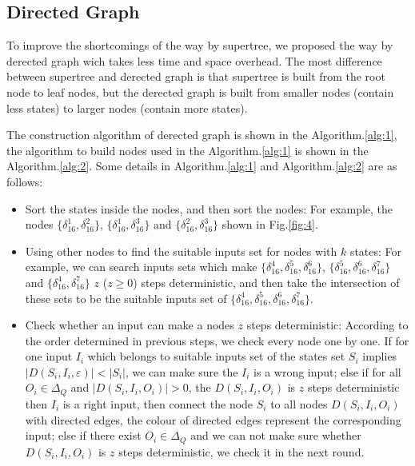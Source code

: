 \subsection{Directed Graph}
To improve the shortcomings of the way by supertree, we proposed the way by derected graph wich takes less time and space overhead. The most difference between supertree and derected graph is that supertree is built from the root node to leaf nodes, but the derected graph is built from smaller nodes (contain less states) to larger nodes (contain more states). 

The construction algorithm of derected graph is shown in the Algorithm.\ref{alg:1}, the algorithm to build nodes used in the Algorithm.\ref{alg:1} is shown in the Algorithm.\ref{alg:2}. Some details in Algorithm.\ref{alg:1} and Algorithm.\ref{alg:2} are as follows:
\begin{itemize}
 \item Sort the states inside the nodes, and then sort the nodes: For example, the nodes $\{\delta_{16}^1,\delta_{16}^2\}$, $\{\delta_{16}^1,\delta_{16}^3\}$ and $\{\delta_{16}^2,\delta_{16}^3\}$ shown in Fig.\ref{fig:4}. 
  \item Using other nodes to find the suitable inputs set for nodes with $k$ states: For example, we can search inputs sets which make $\{\delta_{16}^4,\delta_{16}^5,\delta_{16}^6\}$, $\{\delta_{16}^5,\delta_{16}^6,\delta_{16}^7\}$ and $\{\delta_{16}^4,\delta_{16}^7\}$ $z$ ($z\ge0$) steps deterministic, and then take the intersection of these sets to be the suitable inputs set of $\{\delta_{16}^4,\delta_{16}^5,\delta_{16}^6,\delta_{16}^7\}$. 
  \item Check whether an input can make a nodes $z$ steps deterministic: According to the order determined in previous steps, we check every node one by one. If for one input $I_i$ which belongs to suitable inputs set of the states set $S_i$ implies $|D\left(S_i,I_i,\varepsilon\right)|<|S_i|$, we can make sure the $I_i$ is a wrong input; else if for all $O_i \in \Delta_Q$ and $|D\left(S_i,I_i,O_i\right)|>0$, the $D\left(S_i,I_i,O_i\right)$ is $z$ steps deterministic then $I_i$ is a right input, then connect the node $S_i$ to all nodes $D\left(S_i,I_i,O_i\right)$ with directed edges, the colour of directed edges represent the corresponding input; else if there exist $O_i \in \Delta_Q$ and we can not make sure whether $D\left(S_i,I_i,O_i\right)$ is $z$ steps deterministic, we check it in the next round. 
\end{itemize} 


